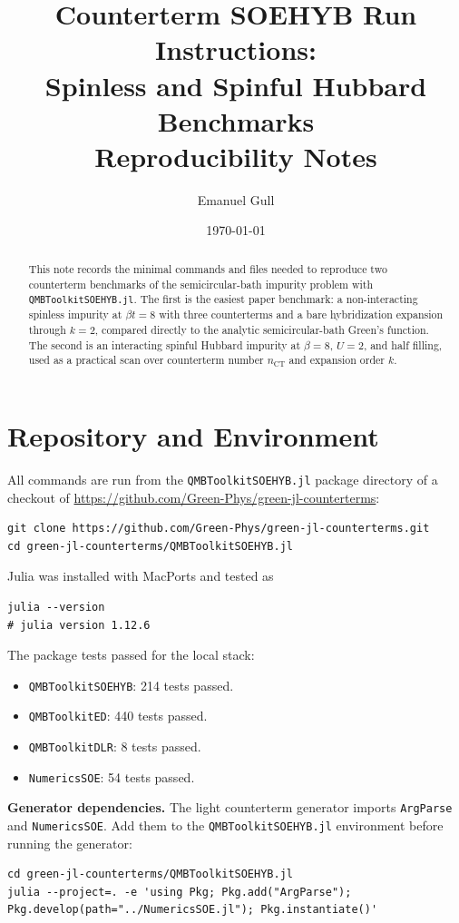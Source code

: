 \documentclass[11pt,a4paper]{article}
\title{\Large\bfseries Counterterm SOEHYB Run Instructions:\\
       Spinless and Spinful Hubbard Benchmarks\\[6pt]
       \normalsize\normalfont Reproducibility Notes}
\author{Emanuel Gull}
\date{\today}
\theoremstyle{definition}
\theoremstyle{plain}
\newenvironment{keybox}[1]{%
  \begin{mdframed}[backgroundcolor=boxbg,linecolor=boxframe,linewidth=1pt,
    innertopmargin=6pt,innerbottommargin=6pt,innerrightmargin=8pt,innerleftmargin=8pt]
  \textbf{#1.}\quad}{\end{mdframed}}
\begin{document}
\maketitle

\begin{abstract}
This note records the minimal commands and files needed to reproduce two
counterterm benchmarks of the semicircular-bath impurity problem with
\texttt{QMBToolkitSOEHYB.jl}.  The first is the easiest paper benchmark: a
non-interacting spinless impurity at $\beta t=8$ with three counterterms and a
bare hybridization expansion through $k=2$, compared directly to the analytic
semicircular-bath Green's function.  The second is an interacting spinful
Hubbard impurity at $\beta=8$, $U=2$, and half filling, used as a practical
scan over counterterm number $n_{\mathrm{CT}}$ and expansion order $k$.
\end{abstract}

\tableofcontents
\newpage

\section{Repository and Environment}

All commands are run from the \texttt{QMBToolkitSOEHYB.jl} package directory of a
checkout of \url{https://github.com/Green-Phys/green-jl-counterterms}:
\begin{verbatim}
git clone https://github.com/Green-Phys/green-jl-counterterms.git
cd green-jl-counterterms/QMBToolkitSOEHYB.jl
\end{verbatim}
Julia was installed with MacPorts and tested as
\begin{verbatim}
julia --version
# julia version 1.12.6
\end{verbatim}
The package tests passed for the local stack:
\begin{itemize}[leftmargin=*]
\item \texttt{QMBToolkitSOEHYB}: 214 tests passed.
\item \texttt{QMBToolkitED}: 440 tests passed.
\item \texttt{QMBToolkitDLR}: 8 tests passed.
\item \texttt{NumericsSOE}: 54 tests passed.
\end{itemize}

\begin{keybox}{Generator dependencies}
The light counterterm generator imports \texttt{ArgParse} and
\texttt{NumericsSOE}.  Add them to the \texttt{QMBToolkitSOEHYB.jl}
environment before running the generator:
\begin{verbatim}
cd green-jl-counterterms/QMBToolkitSOEHYB.jl
julia --project=. -e 'using Pkg; Pkg.add("ArgParse"); Pkg.develop(path="../NumericsSOE.jl"); Pkg.instantiate()'
\end{verbatim}
\end{keybox}
\end{document}
